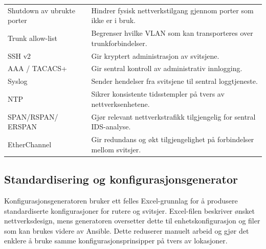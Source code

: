 \begin{table}[H]
\begin{tabular}{
    >{\raggedright\arraybackslash}p{3.8cm}
    >{\raggedright\arraybackslash}p{9.9cm}
}
Shutdown av ubrukte porter &
Hindrer fysisk nettverkstilgang gjennom porter som ikke er i bruk. \\

Trunk allow-list &
Begrenser hvilke VLAN som kan transporteres over trunkforbindelser. \\

SSH v2 &
Gir kryptert administrasjon av svitsjene. \\

AAA / TACACS+ &
Gir sentral kontroll av administrativ innlogging. \\

Syslog &
Sender hendelser fra svitsjene til sentral loggtjeneste. \\

NTP &
Sikrer konsistente tidsstempler på tvers av nettverksenhetene. \\

SPAN/RSPAN/
ERSPAN &
Gjør relevant nettverkstrafikk tilgjengelig for sentral IDS-analyse. \\

EtherChannel &
Gir redundans og økt tilgjengelighet på forbindelser mellom svitsjer. \\

\bottomrule

\end{tabular}


\label{tab:switch-security}

\end{table}


\subsection{Standardisering og konfigurasjonsgenerator}

Konfigurasjonsgeneratoren bruker ett felles Excel-grunnlag for å produsere standardiserte konfigurasjoner for rutere og svitsjer. Excel-filen beskriver ønsket nettverksdesign, mens generatoren oversetter dette til enhetskonfigurasjon og filer som kan brukes videre av Ansible. Dette reduserer manuelt arbeid og gjør det enklere å bruke samme konfigurasjonsprinsipper på tvers av lokasjoner.

